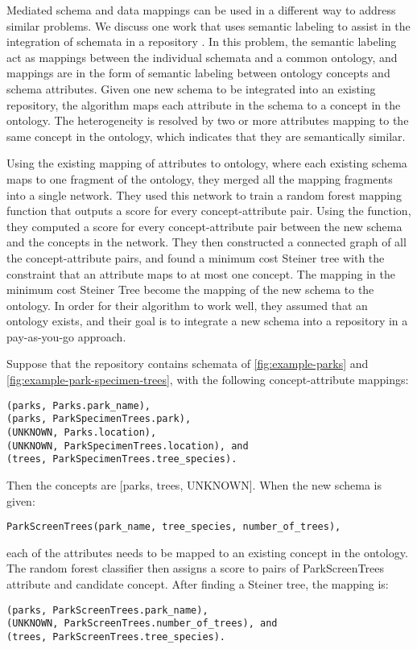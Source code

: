 Mediated schema and data mappings can be used in a different way to address similar problems. We discuss one work that uses semantic labeling to assist in the integration of schemata in a repository \cite{Diego2018Machine}. In this problem, the semantic labeling act as mappings between the individual schemata and a common ontology, and mappings are in the form of semantic labeling between ontology concepts and schema attributes. Given one new schema to be integrated into an existing repository, the algorithm maps each attribute in the schema to a concept in the ontology. The heterogeneity is resolved by two or more attributes mapping to the same concept in the ontology, which indicates that they are semantically similar.

Using the existing mapping of attributes to ontology, where each existing schema maps to one fragment of the ontology, they merged all the mapping fragments into a single network. They used this network to train a random forest mapping function that outputs a score for every concept-attribute pair. Using the function, they computed a score for every concept-attribute pair between the new schema and the concepts in the network. They then constructed a connected graph of all the concept-attribute pairs, and found a minimum cost Steiner tree with the constraint that an attribute maps to at most one concept. The mapping in the minimum cost Steiner Tree become the mapping of the new schema to the ontology. In order for their algorithm to work well, they assumed that an ontology exists, and their goal is to integrate a new schema into a repository in a pay-as-you-go approach.

Suppose that the repository contains schemata of \autoref{fig:example-parks} and \autoref{fig:example-park-specimen-trees}, with the following concept-attribute mappings:
\begin{lstlisting}
(parks, Parks.park_name),
(parks, ParkSpecimenTrees.park),
(UNKNOWN, Parks.location),
(UNKNOWN, ParkSpecimenTrees.location), and
(trees, ParkSpecimenTrees.tree_species).
\end{lstlisting}

Then the concepts are [parks, trees, UNKNOWN]. When the new schema is given:
\begin{lstlisting}
ParkScreenTrees(park_name, tree_species, number_of_trees),
\end{lstlisting}
each of the attributes needs to be mapped to an existing concept in the ontology. The random forest classifier then assigns a score to pairs of ParkScreenTrees attribute and candidate concept. 
After finding a Steiner tree, the mapping is:
\begin{lstlisting}
(parks, ParkScreenTrees.park_name),
(UNKNOWN, ParkScreenTrees.number_of_trees), and
(trees, ParkScreenTrees.tree_species).
\end{lstlisting}

